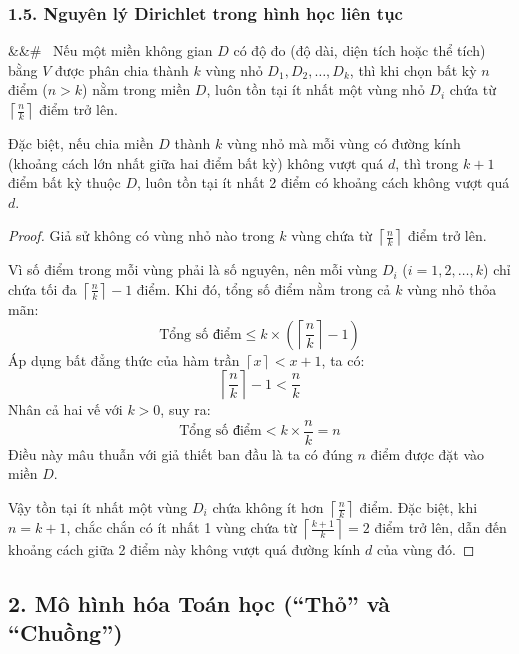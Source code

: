\documentclass[12pt,a4paper]{article}
\newenvironment{mytheorem}[1][]
  {\begin{mdframed}[style=theoremstyle]\noindent\ifx&#1&#\else\textbf{#1}\ \fi\ignorespaces}
  {\end{mdframed}}
\theoremstyle{definition}
\begin{document}
\subsubsection*{1.5. Nguyên lý Dirichlet trong hình học liên tục}

\begin{mytheorem}
Nếu một miền không gian $D$ có độ đo (độ dài, diện tích hoặc thể tích) bằng $V$ được phân chia thành $k$ vùng nhỏ $D_1, D_2, \dots, D_k$, thì khi chọn bất kỳ $n$ điểm ($n > k$) nằm trong miền $D$, luôn tồn tại ít nhất một vùng nhỏ $D_i$ chứa từ $\left\lceil \frac{n}{k} \right\rceil$ điểm trở lên. 

\noindent Đặc biệt, nếu chia miền $D$ thành $k$ vùng nhỏ mà mỗi vùng có đường kính (khoảng cách lớn nhất giữa hai điểm bất kỳ) không vượt quá $d$, thì trong $k+1$ điểm bất kỳ thuộc $D$, luôn tồn tại ít nhất 2 điểm có khoảng cách không vượt quá $d$.
\end{mytheorem}

\begin{proof}
Giả sử không có vùng nhỏ nào trong $k$ vùng chứa từ $\left\lceil \frac{n}{k} \right\rceil$ điểm trở lên.

\noindent Vì số điểm trong mỗi vùng phải là số nguyên, nên mỗi vùng $D_i$ ($i = 1, 2, \dots, k$) chỉ chứa tối đa $\left\lceil \frac{n}{k} \right\rceil - 1$ điểm. Khi đó, tổng số điểm nằm trong cả $k$ vùng nhỏ thỏa mãn:
\[
\text{Tổng số điểm} \le k \times \left( \left\lceil \frac{n}{k} \right\rceil - 1 \right)
\]
Áp dụng bất đẳng thức của hàm trần $\left\lceil x \right\rceil < x + 1$, ta có:
\[
\left\lceil \frac{n}{k} \right\rceil - 1 < \frac{n}{k}
\]
Nhân cả hai vế với $k > 0$, suy ra:
\[
\text{Tổng số điểm} < k \times \frac{n}{k} = n
\]
Điều này mâu thuẫn với giả thiết ban đầu là ta có đúng $n$ điểm được đặt vào miền $D$.

\noindent Vậy tồn tại ít nhất một vùng $D_i$ chứa không ít hơn $\left\lceil \frac{n}{k} \right\rceil$ điểm. Đặc biệt, khi $n = k+1$, chắc chắn có ít nhất 1 vùng chứa từ $\left\lceil \frac{k+1}{k} \right\rceil = 2$ điểm trở lên, dẫn đến khoảng cách giữa 2 điểm này không vượt quá đường kính $d$ của vùng đó.
\end{proof}

\subsection*{2. Mô hình hóa Toán học (``Thỏ'' và ``Chuồng'')}
\end{document}
